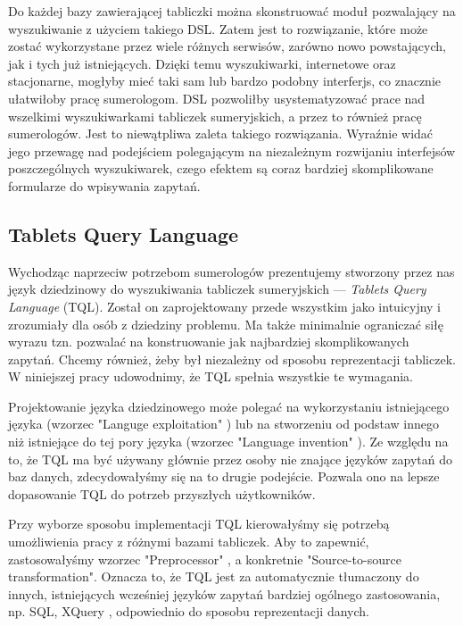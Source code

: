 Do każdej bazy zawierającej tabliczki można skonstruować moduł pozwalający na wyszukiwanie z użyciem takiego DSL.
Zatem jest to rozwiązanie, które może zostać wykorzystane przez wiele różnych serwisów, zarówno nowo powstających, jak i tych już 
istniejących. Dzięki temu wyszukiwarki, internetowe oraz stacjonarne, mogłyby mieć taki sam lub bardzo podobny interferjs, co znacznie 
ułatwiłoby pracę sumerologom. DSL pozwoliłby usystematyzować prace nad wszelkimi wyszukiwarkami tabliczek sumeryjskich, a przez to również 
pracę sumerologów. Jest to niewątpliwa zaleta takiego rozwiązania. Wyraźnie widać jego przewagę nad podejściem polegającym na niezależnym 
rozwijaniu interfejsów poszczególnych wyszukiwarek, czego efektem są coraz bardziej skomplikowane formularze do wpisywania zapytań.


\subsection*{Tablets Query Language}

Wychodząc naprzeciw potrzebom sumerologów prezentujemy stworzony przez nas język dziedzinowy do wyszukiwania tabliczek sumeryjskich --- 
\textit{Tablets Query Language} (TQL). Został on zaprojektowany przede wszystkim jako intuicyjny i zrozumiały dla osób z dziedziny problemu.
 Ma także minimalnie ograniczać siłę wyrazu tzn. pozwalać na konstruowanie jak najbardziej skomplikowanych zapytań. Chcemy również, żeby 
był niezależny od sposobu reprezentacji tabliczek. W niniejszej pracy udowodnimy, że TQL spełnia wszystkie te wymagania. 


Projektowanie języka dziedzinowego może polegać na wykorzystaniu istniejącego języka (wzorzec "Languge exploitation" \cite{mernik}) 
lub na stworzeniu od podstaw innego niż istniejące do tej pory języka (wzorzec "Language invention" \cite{mernik}).
Ze względu na to, że TQL ma być używany głównie przez osoby nie znające języków zapytań do baz danych,
zdecydowałyśmy się na to drugie podejście. Pozwala ono na lepsze dopasowanie TQL do potrzeb przyszłych
użytkowników.


Przy wyborze sposobu implementacji TQL kierowałyśmy się potrzebą umożliwienia pracy z różnymi bazami tabliczek.
Aby to zapewnić, zastosowałyśmy wzorzec "Preprocessor" \cite{mernik}, a konkretnie
"Source-to-source transformation". Oznacza to, że TQL jest za automatycznie tłumaczony do innych,
istniejących wcześniej języków zapytań bardziej ogólnego zastosowania, np. SQL, XQuery \cite{xquery},
odpowiednio do sposobu reprezentacji danych.


